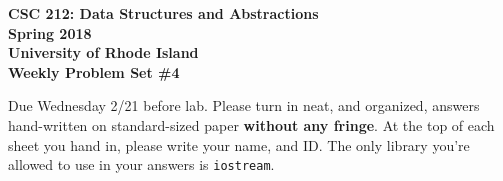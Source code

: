 \documentclass[11pt]{article}
\begin{document}
\thispagestyle{empty}

\begin{center}
    {\Large\bf CSC 212: Data Structures and Abstractions}\\
    \medskip
    {\Large\bf Spring 2018}\\
    \medskip
    {\Large\bf University of Rhode Island}\\
    \bigskip
    {\Large\bf Weekly Problem Set \#4}
\end{center}

Due Wednesday 2/21 before lab. Please turn in neat, and organized, answers hand-written on standard-sized paper \textbf{without any fringe}. At the top of each sheet you hand in, please write your name, and ID.
The only library you're allowed to use in your answers is \verb|iostream|.
\end{document}

